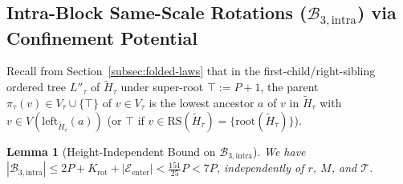 \documentclass[11pt]{article}
\newtheorem{lemma}[theorem]{Lemma}
\theoremstyle{definition}
\theoremstyle{remark}
\newcommand{\RS}{\mathrm{RS}}
\begin{document}
\subsection{Intra-Block Same-Scale Rotations (\texorpdfstring{$\mathcal{B}_{3,\mathrm{intra}}$}{B3-intra}) via Confinement Potential}
\label{subsec:b3-intra}

Recall from Section~\ref{subsec:folded-laws} that in the first-child/right-sibling ordered tree $L''_\tau$ of $\widetilde{H}_\tau$ under super-root $\top := P + 1$, the parent $\pi_\tau(v) \in V_\tau \cup \{\top\}$ of $v \in V_\tau$ is the lowest ancestor $a$ of $v$ in $\widetilde{H}_\tau$ with $v \in V(\mathrm{left}_{\widetilde{H}_\tau}(a))$ (or $\top$ if $v \in \RS(\widetilde{H}_\tau) = \{\mathrm{root}(\widetilde{H}_\tau)\}$).

\begin{lemma}[Height-Independent Bound on $\mathcal{B}_{3,\mathrm{intra}}$]
\label{lem:bucket-b3-intra}
We have $|\mathcal{B}_{3,\mathrm{intra}}| \le 2P + K_{\mathrm{rot}} + |\mathcal{E}_{\mathrm{enter}}| < \frac{151}{25} P < 7 P$, independently of $r$, $M$, and $\mathcal{T}$.
\end{lemma}
\end{document}
